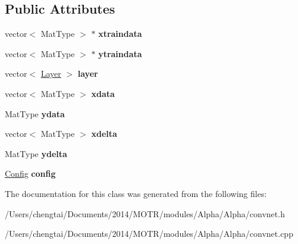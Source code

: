 \subsection*{Public Attributes}
\begin{DoxyCompactItemize}
\item 
\hypertarget{class_conv_net_a28295fc53765f2de2e2ed59fcd0ceca0}{vector$<$ Mat\+Type $>$ $\ast$ {\bfseries xtraindata}}\label{class_conv_net_a28295fc53765f2de2e2ed59fcd0ceca0}

\item 
\hypertarget{class_conv_net_addf411b7159b8745b457c99f61a4d594}{vector$<$ Mat\+Type $>$ $\ast$ {\bfseries ytraindata}}\label{class_conv_net_addf411b7159b8745b457c99f61a4d594}

\item 
\hypertarget{class_conv_net_aa32431ef5efb6e45bd9d85263b70ec73}{vector$<$ \hyperlink{class_layer}{Layer} $>$ {\bfseries layer}}\label{class_conv_net_aa32431ef5efb6e45bd9d85263b70ec73}

\item 
\hypertarget{class_conv_net_a0216c5ea61e7042a58a542925edcd28a}{vector$<$ Mat\+Type $>$ {\bfseries xdata}}\label{class_conv_net_a0216c5ea61e7042a58a542925edcd28a}

\item 
\hypertarget{class_conv_net_aa69ca972e72f0dec3e8eba57bcc905b5}{Mat\+Type {\bfseries ydata}}\label{class_conv_net_aa69ca972e72f0dec3e8eba57bcc905b5}

\item 
\hypertarget{class_conv_net_aac984f4fe5f1c36e40026c539ba7c2cc}{vector$<$ Mat\+Type $>$ {\bfseries xdelta}}\label{class_conv_net_aac984f4fe5f1c36e40026c539ba7c2cc}

\item 
\hypertarget{class_conv_net_a3acdba1ff6f7ef239ab600e1e73b470d}{Mat\+Type {\bfseries ydelta}}\label{class_conv_net_a3acdba1ff6f7ef239ab600e1e73b470d}

\item 
\hypertarget{class_conv_net_aee7939604e55d25def503a860a143e73}{\hyperlink{struct_config}{Config} {\bfseries config}}\label{class_conv_net_aee7939604e55d25def503a860a143e73}

\end{DoxyCompactItemize}


The documentation for this class was generated from the following files\+:\begin{DoxyCompactItemize}
\item 
/\+Users/chengtai/\+Documents/2014/\+M\+O\+T\+R/modules/\+Alpha/\+Alpha/convnet.\+h\item 
/\+Users/chengtai/\+Documents/2014/\+M\+O\+T\+R/modules/\+Alpha/\+Alpha/convnet.\+cpp\end{DoxyCompactItemize}
